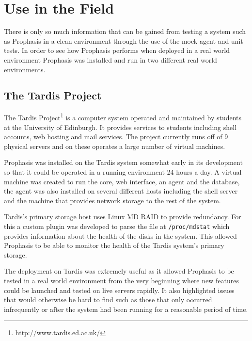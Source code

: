 \documentclass[bsc,deptreport,twoside,parskip,singlespacing,notimes]{infthesis}
\begin{document}
\section{Use in the Field}

	There is only so much information that can be gained from testing a system such
	as Prophasis in a clean environment through the use of the mock agent and unit
	tests.  In order to see how Prophasis performs when deployed in a real world
	environment Prophasis was installed and run in two different real world
	environments.

\subsection{The Tardis Project}
\label{testing-tardis}

	The Tardis Project\footnote{http://www.tardis.ed.ac.uk/} is a computer system
	operated and maintained by students at the University of Edinburgh.
	It provides services to students including shell accounts, web hosting and mail
	services.  The project currently runs off of 9 physical servers and on these
	operates a large number of virtual machines.


	Prophasis was installed on the Tardis system somewhat early in its development
	so that it could be operated in a running environment 24 hours a day. A virtual
	machine was created to run the core, web interface, an agent and the database,
	the agent was also installed on several different hosts including the shell
	server and the machine that provides network storage to the rest of the system.


	Tardis's primary storage host uses Linux MD RAID to provide redundancy.  For
	this a custom plugin was developed to parse the file at \texttt{/proc/mdstat}
	which provides information about the health of the disks in the system. This
	allowed Prophasis to be able to monitor the health of the Tardis system's
	primary storage.


	The deployment on Tardis was extremely useful as it allowed Prophasis to be
	tested in a real world environment from the very beginning where new features
	could be launched and tested on live servers rapidly.  It also highlighted
	issues that would otherwise be hard to find such as those that only occurred
	infrequently or after the system had been running for a reasonable period of
	time.
\end{document}
